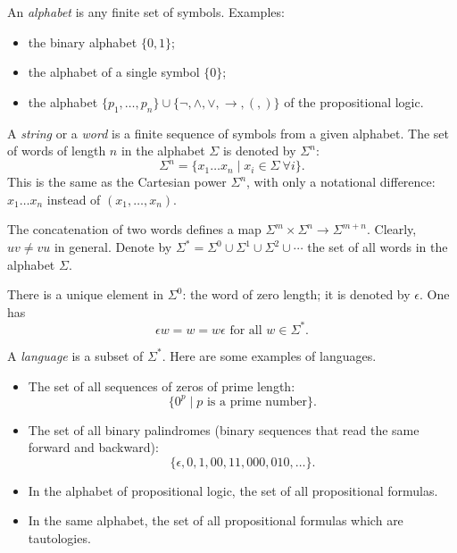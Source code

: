 

\setcounter{section}{1}
\setcounter{subsection}{1}
\setcounter{dfn}{0}

An \emph{alphabet} is any finite set of symbols.
Examples:
\begin{itemize}
\item
the binary alphabet $\{0,1\}$;
\item
the alphabet of a single symbol $\{0\}$;
\item
the alphabet $\{p_1, \ldots, p_n\} \cup \{\neg, \wedge, \vee, \to, (, )\}$ of the propositional logic.
\end{itemize}

A \emph{string} or a \emph{word} is a finite sequence of symbols from a given alphabet.
The set of words of length $n$ in the alphabet $\Sigma$ is denoted by $\Sigma^n$:
\[
\Sigma^n = \{x_1 \ldots x_n \mid x_i \in \Sigma\ \forall i\}.
\]
This is the same as the Cartesian power $\Sigma^n$, with only a notational difference: $x_1 \ldots x_n$
instead of $(x_1, \ldots, x_n)$.

The concatenation of two words defines a map $\Sigma^m \times \Sigma^n \to \Sigma^{m+n}$.
Clearly, $uv \ne vu$ in general.
Denote by $\Sigma^* = \Sigma^0 \cup \Sigma^1 \cup \Sigma^2 \cup \cdots$ the set of all words in the alphabet $\Sigma$.

There is a unique element in $\Sigma^0$: the word of zero length; it is denoted by $\epsilon$.
One has
\[
\epsilon w = w = w\epsilon \text{ for all } w \in \Sigma^*.
\]

A \emph{language} is a subset of $\Sigma^*$.
Here are some examples of languages.

\begin{itemize}
\item
The set of all sequences of zeros of prime length:
\[
\{0^p \mid p \text{ is a prime number}\}.
\]
\item
The set of all binary palindromes (binary sequences that read the same forward and backward):
\[
\{\epsilon, 0, 1, 00, 11, 000, 010, \ldots\}.
\]
\item
In the alphabet of propositional logic, the set of all propositional formulas.
\item
In the same alphabet, the set of all propositional formulas which are tautologies.
\end{itemize}







